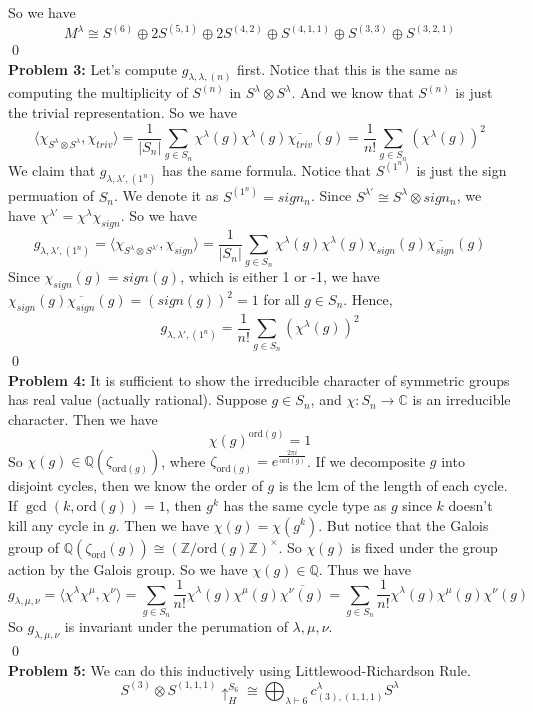 \documentclass[12pt]{amsart}
\newcommand{\Q}{\mathbb{Q}}
\newcommand{\C}{\mathbb{C}}
\newcommand{\Z}{\mathbb{Z}}
\newcommand{\ord}{\mathrm{ord}}
\begin{document}
So we have 
\[M^\lambda\cong S^{(6)}\oplus 2S^{(5,1)}\oplus 2S^{(4,2)}\oplus S^{(4,1,1)}\oplus  S^{(3,3)}\oplus S^{(3,2,1)}\]\qed\\
\textbf{Problem 3:} Let's compute $g_{\lambda,\lambda,(n)}$ first. Notice that this is the same as computing the multiplicity of $S^{(n)}$ in $S^{\lambda}\otimes S^\lambda$. And we know that $S^{(n)}$ is just the trivial representation. So we have 
\[\langle\chi_{S^\lambda\otimes S^\lambda},\chi_{triv}\rangle=\frac{1}{|S_n|}\sum_{g\in S_n}\chi^\lambda(g)\chi^\lambda(g)\overline{\chi_{triv}}(g)=\frac{1}{n!}\sum_{g\in S_n}(\chi^\lambda(g))^2\]
We claim that $g_{\lambda,\lambda',(1^n)}$ has the same formula. Notice that $S^{(1^n)}$ is just the sign permuation of $S_n$. We denote it as $S^{(1^n)}=sign_n$. Since $S^{\lambda'}\cong S^\lambda\otimes sign_{n}$, we have $\chi^{\lambda'}=\chi^\lambda\chi_{sign}$. So we have 
\[g_{\lambda,\lambda',(1^n)}=\langle\chi_{S^\lambda\otimes S^{\lambda'}},\chi_{sign}\rangle=\frac{1}{|S_n|}\sum_{g\in S_n}\chi^\lambda(g)\chi^\lambda(g)\chi_{sign}(g)\overline{\chi_{sign}}(g)\]
Since $\chi_{sign}(g)=sign(g)$, which is either 1 or -1, we have $\chi_{sign}(g)\overline{\chi_{sign}}(g)=(sign(g))^2=1$ for all $g\in S_n$. Hence,
\[g_{\lambda,\lambda',(1^n)}=\frac{1}{n!}\sum_{g\in S_n}(\chi^\lambda(g))^2\]
\qed\\
\textbf{Problem 4:} It is sufficient to show the irreducible character of symmetric groups has real value (actually rational). Suppose $g\in S_n$, and $\chi: S_n\to \C$ is an irreducible character. Then we have 
\[\chi(g)^{\ord(g)}=1\]
So $\chi(g)\in \Q(\zeta_{\ord(g)})$, where $\zeta_{\ord(g)}=e^{\frac{2\pi i }{\ord(g)}}$. If we decomposite $g$ into disjoint cycles, then we know the order of $g$ is the lcm of the length of each cycle. If $\gcd(k,\ord(g))=1$, then $g^k$ has the same cycle type as $g$ since $k$ doesn't kill any cycle in $g$. Then we have $\chi(g)=\chi(g^k)$. But notice that the Galois group of $\Q(\zeta_\ord(g))\cong (\Z/\ord(g)\Z)^\times$. So $\chi(g)$ is fixed under the group action by the Galois group. So we have $\chi(g)\in \Q$. Thus we have 
\[g_{\lambda,\mu,\nu }=\langle\chi^\lambda\chi^\mu,\chi^\nu\rangle=\sum_{g\in S_n}\frac{1}{n!}\chi^\lambda(g)\chi^\mu(g)\overline{\chi^\nu(g)}=\sum_{g\in S_n}\frac{1}{n!}\chi^\lambda(g)\chi^\mu(g)\chi^\nu(g)\]
So $g_{\lambda,\mu,\nu }$ is invariant under the perumation of $\lambda,\mu,\nu$.\\\qed\\
\textbf{Problem 5:} We can do this inductively using Littlewood-Richardson Rule. 
\[S^{(3)}\otimes S^{(1,1,1)}\uparrow_H^{S_6}\cong \bigoplus_{\lambda\vdash 6}c_{(3),(1,1,1)}^\lambda S^\lambda \]
\end{document}

